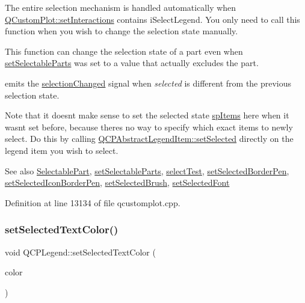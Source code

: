 The entire selection mechanism is handled automatically when \hyperlink{class_q_custom_plot_a5ee1e2f6ae27419deca53e75907c27e5}{Q\+Custom\+Plot\+::set\+Interactions} contains i\+Select\+Legend. You only need to call this function when you wish to change the selection state manually.

This function can change the selection state of a part even when \hyperlink{class_q_c_p_legend_a9ce60aa8bbd89f62ae4fa83ac6c60110}{set\+Selectable\+Parts} was set to a value that actually excludes the part.

emits the \hyperlink{class_q_c_p_legend_a82c88464edac07a9eefaf3906268df3b}{selection\+Changed} signal when {\itshape selected} is different from the previous selection state.

Note that it doesn\textquotesingle{}t make sense to set the selected state \hyperlink{class_q_c_p_legend_a5404de8bc1e4a994ca4ae69e2c7072f1a768bfb95f323db4c66473375032c0af7}{sp\+Items} here when it wasn\textquotesingle{}t set before, because there\textquotesingle{}s no way to specify which exact items to newly select. Do this by calling \hyperlink{class_q_c_p_abstract_legend_item_a6eed93b0ab99cb3eabb043fb08179c2b}{Q\+C\+P\+Abstract\+Legend\+Item\+::set\+Selected} directly on the legend item you wish to select.

\begin{DoxySeeAlso}{See also}
\hyperlink{class_q_c_p_legend_a5404de8bc1e4a994ca4ae69e2c7072f1}{Selectable\+Part}, \hyperlink{class_q_c_p_legend_a9ce60aa8bbd89f62ae4fa83ac6c60110}{set\+Selectable\+Parts}, \hyperlink{class_q_c_p_legend_acd7be544c81324e391cfa6be9c413c01}{select\+Test}, \hyperlink{class_q_c_p_legend_a2c35d262953a25d96b6112653fbefc88}{set\+Selected\+Border\+Pen}, \hyperlink{class_q_c_p_legend_ade93aabe9bcccaf9cf46cec22c658027}{set\+Selected\+Icon\+Border\+Pen}, \hyperlink{class_q_c_p_legend_a875227f3219c9799464631dec5e8f1bd}{set\+Selected\+Brush}, \hyperlink{class_q_c_p_legend_ab580a01c3c0a239374ed66c29edf5ad2}{set\+Selected\+Font} 
\end{DoxySeeAlso}


Definition at line 13134 of file qcustomplot.\+cpp.

\mbox{\label{class_q_c_p_legend_a7674dfc7a1f30e1abd1018c0ed45e0bc}} 
\subsubsection{\texorpdfstring{set\+Selected\+Text\+Color()}{setSelectedTextColor()}}
{\footnotesize\ttfamily void Q\+C\+P\+Legend\+::set\+Selected\+Text\+Color (\begin{DoxyParamCaption}\item[{const Q\+Color \&}]{color }\end{DoxyParamCaption})}


